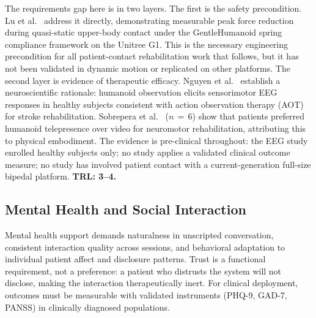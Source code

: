 \documentclass[acmjour]{acmart}
\begin{document}
The requirements gap here is in two layers. The first is the safety precondition.
Lu et al.~\cite{lu2025gentlehumanoid} address it directly, demonstrating
measurable peak force reduction during quasi-static upper-body contact under the
GentleHumanoid spring compliance framework on the Unitree G1. This is the
necessary engineering precondition for all patient-contact rehabilitation work
that follows, but it has not been validated in dynamic motion or replicated on
other platforms. The second layer is evidence of therapeutic efficacy. Nguyen et
al.~\cite{nguyen2024eeg} establish a neuroscientific rationale: humanoid
observation elicits sensorimotor EEG responses in healthy subjects consistent with
action observation therapy (AOT) for stroke rehabilitation. Sobrepera et
al.~\cite{sobrepera2022feasibility} ($n\,=\,6$) show that patients preferred
humanoid telepresence over video for neuromotor rehabilitation, attributing this
to physical embodiment. The evidence is pre-clinical throughout: the EEG study
enrolled healthy subjects only; no study applies a validated clinical outcome
measure; no study has involved patient contact with a current-generation full-size
bipedal platform. \textbf{TRL: 3--4.}

\subsection{Mental Health and Social Interaction}
\label{sec:mentalhealth}

Mental health support demands naturalness in unscripted conversation, consistent
interaction quality across sessions, and behavioral adaptation to individual
patient affect and disclosure patterns. Trust is a functional requirement, not a
preference: a patient who distrusts the system will not disclose, making the
interaction therapeutically inert. For clinical deployment, outcomes must be
measurable with validated instruments (PHQ-9, GAD-7, PANSS) in clinically
diagnosed populations.
\end{document}
